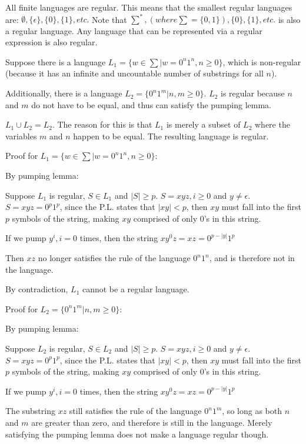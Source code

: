 \documentclass{article}
\begin{document}
\begin{enumerate}
  All finite languages are regular. This means that the smallest regular languages are:
  $\emptyset, \{\epsilon\}, \{0\}, \{1\}, etc.$
  Note that $\sum^*, (where \sum = \{0,1\}), \{0\}, \{1\}, etc.$ is also a regular language.
  Any language that can be represented via a regular expression is also regular.
  
  Suppose there is a language $L_1 = \{w \in \sum | w = 0^n1^n, n \geq 0\}$, which is non-regular (because it has an infinite and uncountable number of substrings for all $n$).
  
  Additionally, there is a language $L_2 = \{0^n1^m | n, m \geq 0\}$. $L_2$ is regular because $n$ and $m$ do not have to be equal,
  and thus can satisfy the pumping lemma. 
  
  $L_1 \cup L_2 = L_2$. The reason for this is that $L_1$ is merely a subset of $L_2$ where the variables $m$ and $n$ happen to
  be equal. The resulting language is regular.
  
  Proof for $L_1 = \{w \in \sum | w = 0^n1^n, n \geq 0\}$:
  
  	By pumping lemma:
  	
  		Suppose $L_1$ is regular, $S \in L_1$ and $|S| \geq p$.
  		$S = xyz, i \geq 0 $ and $y \neq \epsilon$.
  		$S = xyz = 0^p1^p$, since the P.L. states that $|xy| < p$, then $xy$ must fall into the first $p$ symbols of the string,
  		making $xy$ comprised of only 0's in this string. 
  		
  		If we pump $y^i, i = 0$ times, then the string $xy^0z = xz = 0^{p-|y|}1^p$
  		
  		Then $xz$ no longer satisfies the rule of the language $0^n1^n$, and is therefore not in the language. 
  		
  		By contradiction, $L_1$ cannot be a regular language.
  		
  		
  Proof for $L_2 = \{0^n1^m | n, m \geq 0\}$:
  	
  	By pumping lemma:
  	
  		Suppose $L_2$ is regular, $S \in L_2$ and $|S| \geq p$.
  		$S = xyz, i \geq 0 $ and $y \neq \epsilon$.
  		$S = xyz = 0^p1^p$, since the P.L. states that $|xy| < p$, then $xy$ must fall into the first $p$ symbols of the string,
  		making $xy$ comprised of only 0's in this string. 
  		
  		If we pump $y^i, i = 0$ times, then the string $xy^0z = xz = 0^{p-|y|}1^p$
  		
  		The substring $xz$ still satisfies the rule of the language $0^n1^m$, so long as both $n$ and $m$ are greater than zero,
  		and therefore is still in the language. Merely satisfying the pumping lemma does not make a language regular though.
  		

\end{enumerate}
\end{document}

